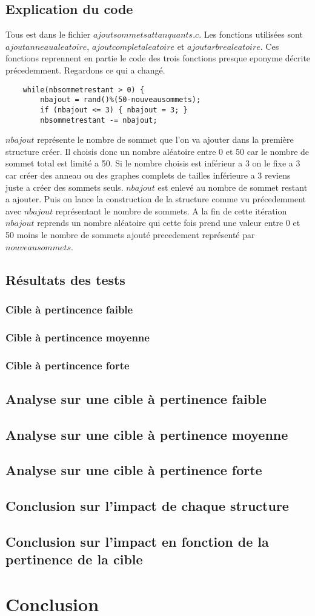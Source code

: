 \documentclass[a4paper,11pt]{article}
\begin{document}
	\subsection{Explication du code}
		Tous est dans le fichier $ajoutsommetsattanquants.c$. Les fonctions utilisées sont $ajoutanneaualeatoire$, $ajoutcompletaleatoire$
		et $ajoutarbrealeatoire$. Ces fonctions reprennent en partie le code des trois fonctions presque eponyme décrite précedemment.
		Regardons ce qui a changé. 
		\begin{lstlisting}
	while(nbsommetrestant > 0) {
		nbajout = rand()%(50-nouveausommets);
		if (nbajout <= 3) { nbajout = 3; }
		nbsommetrestant -= nbajout;
		\end{lstlisting}
		$nbajout$ représente le nombre de sommet que l'on va ajouter dans la première structure créer. Il choisis donc un nombre 
		aléatoire entre 0 et 50 car le nombre de sommet total est limité a 50. Si le nombre choisis est inférieur a 3 on le fixe a 3 car créer
		des anneau ou des graphes complets de tailles inférieure a 3 reviens juste a créer des sommets seuls.
		$nbajout$ est enlevé au nombre de sommet restant a ajouter. Puis on lance la construction de la structure comme vu précedemment 
		avec $nbajout$ représentant le nombre de sommets. A la fin de cette itération $nbajout$ reprends un nombre aléatoire qui cette fois
		prend une valeur entre 0 et 50 moins le nombre de sommets ajouté precedement représenté par $nouveausommets$.
	\subsection{Résultats des tests}
		\subsubsection{Cible à pertincence faible}
		\subsubsection{Cible à pertincence moyenne}
		\subsubsection{Cible à pertincence forte}


	\subsection{Analyse sur une cible à pertinence faible}
	\subsection{Analyse sur une cible à pertinence moyenne}
	\subsection{Analyse sur une cible à pertinence forte}
	\subsection{Conclusion sur l'impact de chaque structure}
	\subsection{Conclusion sur l'impact en fonction de la pertinence de la cible}

\section{Conclusion}
\end{document}
